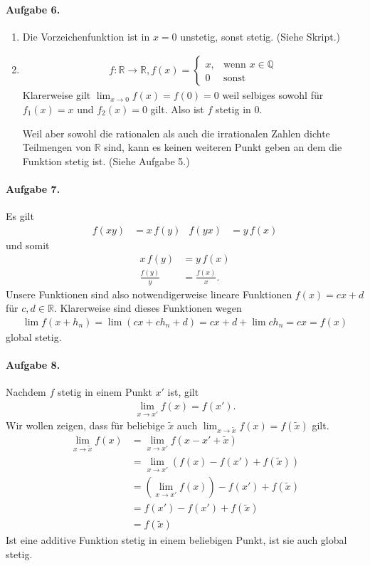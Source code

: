 \documentclass{article}
\begin{document}
\paragraph{Aufgabe 6.}
\begin{enumerate}
    \item Die Vorzeichenfunktion ist in $x = 0$ unstetig, sonst stetig. (Siehe Skript.)
    \item \begin{align*}
        f: \mathbb{R} \rightarrow \mathbb{R}, f(x) = \begin{cases}
            x, & \text{wenn $x \in \mathbb{Q}$} \\
            0 & \text{sonst}
        \end{cases}
    \end{align*}
    Klarerweise gilt $\lim_{x \to 0} f(x) = f(0) = 0$ weil selbiges sowohl für $f_1(x) = x$ und $f_2(x) = 0$ gilt. Also ist $f$ stetig in 0.

    Weil aber sowohl die rationalen als auch die irrationalen Zahlen dichte Teilmengen von $\mathbb{R}$ sind, kann es keinen weiteren Punkt geben an dem die Funktion stetig ist. (Siehe Aufgabe 5.)
\end{enumerate}

\paragraph{Aufgabe 7.}
Es gilt
\begin{align*}
    f(xy) &= x\, f(y) & f(yx) &= y\, f(x)
\end{align*}
und somit
\begin{align*}
    x\, f(y) &= y\, f(x) \\
    \frac{f(y)}{y} &= \frac{f(x)}{x}.
\end{align*}
Unsere Funktionen sind also notwendigerweise lineare Funktionen $f(x) = cx + d$ für $c, d \in \mathbb{R}$. Klarerweise sind dieses Funktionen wegen
\begin{align*}
    \lim f(x + h_n) = \lim (cx + ch_n + d) = cx + d + \lim ch_n = cx = f(x)
\end{align*}
global stetig.

\paragraph{Aufgabe 8.} Nachdem $f$ stetig in einem Punkt $x'$ ist, gilt 
\begin{align*}
    \lim_{x \to x'} f(x) = f(x').
\end{align*}
Wir wollen zeigen, dass für beliebige $\tilde{x}$ auch $\lim_{x \to \tilde{x}}f(x) = f(\tilde{x})$ gilt.
\begin{align*}
    \lim_{x \to \tilde{x}} f(x) &= \lim_{x \to x'} f(x - x' + \tilde{x}) \\
    &= \lim_{x \to x'} (f(x) - f(x') + f(\tilde{x})) \\
    &= (\lim_{x \to x'}f(x)) - f(x') + f(\tilde{x}) \\
    &= f(x') - f(x') + f(\tilde{x}) \\
    &= f(\tilde{x})
\end{align*}
Ist eine additive Funktion stetig in einem beliebigen Punkt, ist sie auch global stetig.
\end{document}
